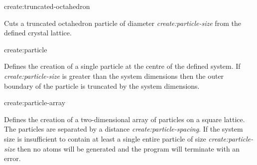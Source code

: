{\zicf create:truncated-octahedron}
Cuts a truncated octahedron particle of diameter \textit{create:particle-size}
from the defined crystal lattice.


{\zicf create:particle} Defines the creation of a single particle at the centre of the defined system. If \textit{create:particle-size} is greater than the system dimensions then the outer boundary of the particle is truncated by the system dimensions.

{\zicf create:particle-array} Defines the creation of a two-dimensional array of particles on a square lattice. The particles are separated by a distance \textit{create:particle-spacing}. If the system size is insufficient to contain at least a single entire particle of size \textit{create:particle-size} then no atoms will be generated and the program will terminate with an error.


